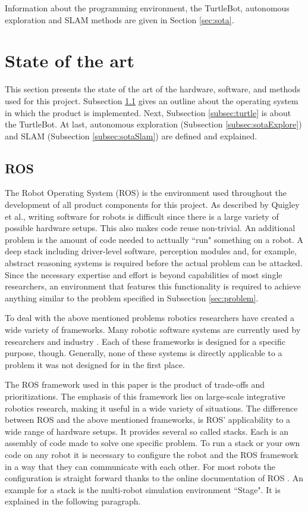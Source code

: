 \documentclass{ba-kecs}
\begin{document}
Information about the programming environment, the TurtleBot, autonomous exploration and SLAM methods are given in Section \ref{sec:sota}.  

\section{State of the art}
This section presents the state of the art of the hardware, software, and methods used for this project. Subsection \ref{subsec:ros} gives an outline about the operating system in which the product is implemented. Next, Subsection \ref{subsec:turtle} is about the TurtleBot. At last, autonomous exploration (Subsection \ref{subsec:sotaExplore}) and SLAM (Subsection \ref{subsec:sotaSlam}) 
\label{sec:sota} are defined and explained.
\subsection{ROS}
\label{subsec:ros}
The Robot Operating System (ROS) \cite{Quigley} is the environment used throughout the development of all product components for this project. As described by Quigley et al., writing software for robots is difficult since there is a large variety of possible hardware setups. This also makes code reuse non-trivial. An additional problem is the amount of code needed to acttually ``run" something on a robot. A deep stack including driver-level software, perception modules and, for example, abstract reasoning systems is required before the actual problem can be attacked. Since the necessary expertise and effort is beyond capabilities of most single researchers, an environment that features this functionality is required to achieve anything similar to the problem specified in Subsection \ref{sec:problem}.

To deal with the above mentioned problems robotics researchers have created a wide variety of frameworks. Many robotic software systems are currently used by researchers and industry \cite{Kramer}. Each of these frameworks is designed for a specific purpose, though. Generally, none of these systems is directly applicable to a problem it was not designed for in the first place.

The ROS framework used in this paper is the product of trade-offs and prioritizations. The emphasis of this framework lies on large-scale integrative robotics research, making it useful in a wide variety of situations. The difference between ROS and the above mentioned frameworks, is ROS' applicability to a wide range of hardware setups.  It provides several so called stacks. Each is an assembly of code made to solve one specific problem. To run a stack or your own code on any robot it is necessary to configure the robot and the ROS framework in a way that they can communicate with each other. For most robots the configuration is straight forward thanks to the online documentation of ROS \citep{Roswiki}.  An example for a stack is the multi-robot simulation environment ``Stage". It is explained in the following paragraph.
\end{document}
